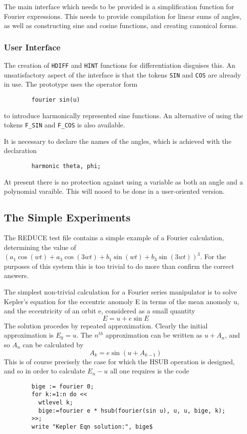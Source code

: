 The main interface which needs to be provided is a simplification
function for Fourier expressions.  This needs to provide compilation
for linear sums of angles, as well as constructing sine and cosine
functions, and creating canonical forms.

\subsubsection{User Interface}

The creation of \texttt{HDIFF} and \texttt{HINT} functions for
differentiation disguises this.  An unsatisfactory aspect of the
interface is that the tokens \texttt{SIN} and \texttt{COS} are already in
use.  The prototype uses the operator form
\begin{verbatim}
        fourier sin(u)
\end{verbatim}
to introduce harmonically represented sine functions.  An alternative of
using the tokens \texttt{F\_SIN} and \texttt{F\_COS} is also available.

It is necessary to declare the names of the angles, which is achieved
with the declaration
\begin{verbatim}
        harmonic theta, phi;
\end{verbatim}

At present there is no protection against using a variable as both an
angle and a polynomial varaible.  This will nooed to be done in a
user-oriented version.

\subsection{The Simple Experiments}

The REDUCE test file contains a simple example of a Fourier
calculation, determining the value of $(a_1 \cos({wt}) + a_3
\cos(3{wt}) + b_1 \sin({wt}) + b_3 \sin(3{wt}))^3$.  For the purposes
of this system this is too trivial to do more than confirm the correct
answers.

The simplest non-trivial calculation for a Fourier series manipulator
is to solve Kepler's equation for the eccentric anomoly E in terms of
the mean anomoly u, and the eccentricity of an orbit e, considered as a
small quantity
\[
        E = u + e \sin E
\]
The solution procedes by repeated approximation.  Clearly the initial
approximation is $E_0 = u$.  The $n^{th}$ approximation can be written
as $u + A_n$, and so $A_n$ can be calculated by
\[
        A_k = e \sin (u + A_{k-1})
\]
This is of course precisely the case for which the HSUB operation is
designed, and so in order to calculate $E_n - u$ all one requires is
the code
\begin{verbatim}
        bige := fourier 0;
        for k:=1:n do <<
          wtlevel k;
          bige:=fourier e * hsub(fourier(sin u), u, u, bige, k);
        >>;
        write "Kepler Eqn solution:", bige$
\end{verbatim}

